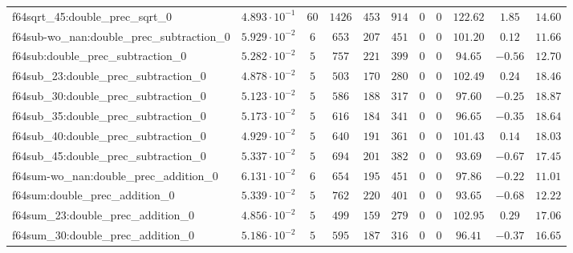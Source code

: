 \begin{tabular}{|l|c|c|c|c|c|c|c|c|c|c|}
f64sqrt\_45:double\_prec\_sqrt\_0              & $ 4.893 \cdot 10^{-1} $ & $ 60     $ & $ 1426   $ & $ 453   $ & $ 914   $ & $ 0   $ & $ 0 $ & $ 122.62      $ & $ 1.85    $ & $ 14.60   $ \\
f64sub-wo\_nan:double\_prec\_subtraction\_0    & $ 5.929 \cdot 10^{-2} $ & $ 6      $ & $ 653    $ & $ 207   $ & $ 451   $ & $ 0   $ & $ 0 $ & $ 101.20      $ & $ 0.12    $ & $ 11.66   $ \\
f64sub:double\_prec\_subtraction\_0            & $ 5.282 \cdot 10^{-2} $ & $ 5      $ & $ 757    $ & $ 221   $ & $ 399   $ & $ 0   $ & $ 0 $ & $ 94.65       $ & $ -0.56   $ & $ 12.70   $ \\
f64sub\_23:double\_prec\_subtraction\_0        & $ 4.878 \cdot 10^{-2} $ & $ 5      $ & $ 503    $ & $ 170   $ & $ 280   $ & $ 0   $ & $ 0 $ & $ 102.49      $ & $ 0.24    $ & $ 18.46   $ \\
f64sub\_30:double\_prec\_subtraction\_0        & $ 5.123 \cdot 10^{-2} $ & $ 5      $ & $ 586    $ & $ 188   $ & $ 317   $ & $ 0   $ & $ 0 $ & $ 97.60       $ & $ -0.25   $ & $ 18.87   $ \\
f64sub\_35:double\_prec\_subtraction\_0        & $ 5.173 \cdot 10^{-2} $ & $ 5      $ & $ 616    $ & $ 184   $ & $ 341   $ & $ 0   $ & $ 0 $ & $ 96.65       $ & $ -0.35   $ & $ 18.64   $ \\
f64sub\_40:double\_prec\_subtraction\_0        & $ 4.929 \cdot 10^{-2} $ & $ 5      $ & $ 640    $ & $ 191   $ & $ 361   $ & $ 0   $ & $ 0 $ & $ 101.43      $ & $ 0.14    $ & $ 18.03   $ \\
f64sub\_45:double\_prec\_subtraction\_0        & $ 5.337 \cdot 10^{-2} $ & $ 5      $ & $ 694    $ & $ 201   $ & $ 382   $ & $ 0   $ & $ 0 $ & $ 93.69       $ & $ -0.67   $ & $ 17.45   $ \\
f64sum-wo\_nan:double\_prec\_addition\_0       & $ 6.131 \cdot 10^{-2} $ & $ 6      $ & $ 654    $ & $ 195   $ & $ 451   $ & $ 0   $ & $ 0 $ & $ 97.86       $ & $ -0.22   $ & $ 11.01   $ \\
f64sum:double\_prec\_addition\_0               & $ 5.339 \cdot 10^{-2} $ & $ 5      $ & $ 762    $ & $ 220   $ & $ 401   $ & $ 0   $ & $ 0 $ & $ 93.65       $ & $ -0.68   $ & $ 12.22   $ \\
f64sum\_23:double\_prec\_addition\_0           & $ 4.856 \cdot 10^{-2} $ & $ 5      $ & $ 499    $ & $ 159   $ & $ 279   $ & $ 0   $ & $ 0 $ & $ 102.95      $ & $ 0.29    $ & $ 17.06   $ \\
f64sum\_30:double\_prec\_addition\_0           & $ 5.186 \cdot 10^{-2} $ & $ 5      $ & $ 595    $ & $ 187   $ & $ 316   $ & $ 0   $ & $ 0 $ & $ 96.41       $ & $ -0.37   $ & $ 16.65   $ \\

\end{tabular}
